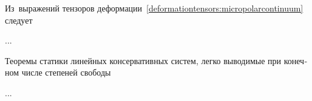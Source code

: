\label{para:compatibilityequations.cosseratcontinuum}

\begin{otherlanguage}{russian}

Из~выражений тензоров деформации~\eqref{deformationtensors:micropolarcontinuum} следует

...



\end{otherlanguage}



\begin{otherlanguage}{russian}

Теоремы статики линейных консервативных систем, легко выводимые при конечном числе степеней свободы

...



\end{otherlanguage}



\label{para:caseoflatenttrihedron.smalldisplacementsandrotations}

